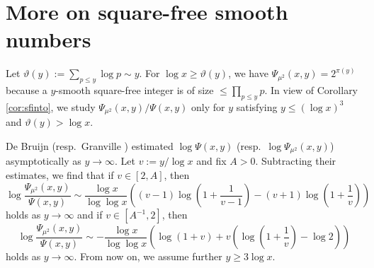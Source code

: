 \documentclass{amsart}
\theoremstyle{plain}
\theoremstyle{remark}
\begin{document}
\section{More on square-free smooth numbers}\label{sec:moresfree}
Let $\vartheta(y):=\sum_{p \le y} \log p \sim y$. For $\log x\ge \vartheta(y)$, we have $\Psi_{\mu^2}(x,y)=2^{\pi(y)}$ because a $y$-smooth square-free integer is of size $\le \prod_{p \le y}p$. In view of Corollary \ref{cor:sfinto}, we study $\Psi_{\mu^2}(x,y)/\Psi(x,y)$ only for $y$ satisfying $y \le (\log x)^3$ and $\vartheta(y)>\log x$.

De Bruijn \cite{debruijn1966} (resp.~Granville \cite{Granville}) estimated $\log \Psi(x,y)$ (resp.~$\log \Psi_{\mu^2}(x,y)$) asymptotically as $y \to \infty$. Let $v:=y/\log x$ and fix $A>0$. Subtracting their estimates, we find that if $v \in [2,A]$, then
\[\log \frac{\Psi_{\mu^2}(x,y)}{\Psi(x,y)} \sim \frac{\log x}{\log \log x}	\left( (v-1)\log\left(1 + \frac{1}{v-1}\right) - (v+1) \log \left(1+\frac{1}{v}\right)\right)\]
holds as $y \to \infty$ and  if $v \in [A^{-1},2]$, then
\[\log \frac{\Psi_{\mu^2}(x,y)}{\Psi(x,y)} \sim -\frac{\log x}{\log \log x}	\left( \log(1+v)+v\left(\log\left(1+\frac{1}{v}\right)-\log 2\right)\right)\]
holds as $y \to \infty$.  From now on, we assume further $y\ge 3\log x$.
\end{document}
